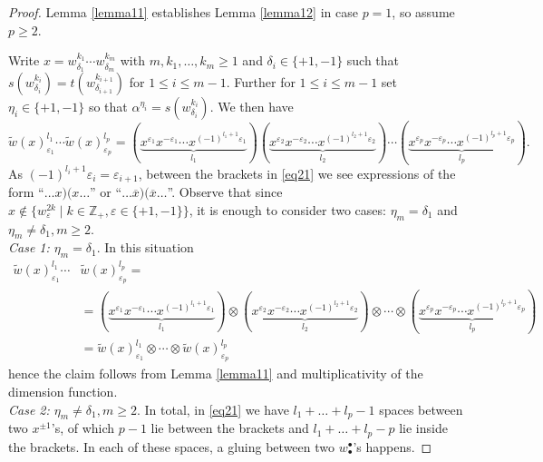 \documentclass[10pt,a4paper]{amsart}
\newcommand{\ZZ}{\mathbb{Z}}
\newcommand{\eps}{\varepsilon}
\newcommand{\ov}{\overline}
\begin{document}
\begin{proof}
Lemma \ref{lemma11} establishes Lemma \ref{lemma12} in case $p=1$, so assume $p\ge 2$.

Write $x=w^{k_1}_{\delta_1}\cdots w^{k_m}_{\delta_m}$ with $m,k_1,\dotsc,k_m\ge 1$ and $\delta_i\in \{+1,-1\}$ such that $s(w^{k_i}_{\delta_i})=t(w^{k_{i+1}}_{\delta_{i+1}})$ for $1\le i \le m-1$. Further for $1\le i \le m-1$  set $\eta_i\in\{+1, -1\}$ so that  $\alpha^{\eta_i}=s(w^{k_i}_{\delta_{i}})$. We then have
\begin{equation}\label{eq21}
\widetilde{w}(x)^{l_1}_{\eps_1}\cdots
\widetilde{w}(x)^{l_p}_{\eps_p}=
( \underbrace{x^{\eps_1}x^{-\eps_1} \cdots 
x^{(-1)^{l_1+1} \eps_1}}_{l_1})
( \underbrace{x^{\eps_2}x^{-\eps_2} \cdots 
x^{(-1)^{l_2+1} \eps_2}}_{l_2})
\cdots 
( \underbrace{x^{\eps_p}x^{-\eps_p} \cdots 
x^{(-1)^{l_p+1} \eps_p}}_{l_p}).
\end{equation}
As $(-1)^{l_{i}+1}\eps_i = \eps_{i+1}$,  between the brackets in \eqref{eq21} we see expressions of the form  ``$\dotsc x ) ( x \dotsc$'' or ``$\dotsc \ov{x} ) (\ov{x}\dotsc$''. Observe that since $x\notin\{ w^{2k}_\eps\mid k\in\ZZ_+,\eps\in\{+1,-1\}\}$, it is enough to consider two cases: $\eta_m=\delta_1$ and $\eta_m\neq \delta_1,m\ge 2$.\\

\emph{Case 1: $\eta_m=\delta_1$}. In this situation 
\begin{align*}
\widetilde{w}(x)^{l_1}_{\eps_1}\cdots&
\widetilde{w}(x)^{l_p}_{\eps_p} =\\
&=
( \underbrace{x^{\eps_1}x^{-\eps_1} \cdots 
x^{(-1)^{l_1+1} \eps_1}}_{l_1})\otimes
( \underbrace{x^{\eps_2}x^{-\eps_2} \cdots 
x^{(-1)^{l_2+1} \eps_2}}_{l_2})\otimes
\cdots \otimes
( \underbrace{x^{\eps_p}x^{-\eps_p} \cdots 
x^{(-1)^{l_p+1} \eps_p}}_{l_p})\\
&=
\widetilde{w}(x)^{l_1}_{\eps_1}\otimes\cdots\otimes
\widetilde{w}(x)^{l_p}_{\eps_p}
\end{align*}
hence the claim follows from Lemma \ref{lemma11} and multiplicativity of the dimension function.\\

\emph{Case 2: $\eta_m\neq \delta_1, m\ge 2$}.
In total, in \eqref{eq21} we have
$l_1+\dotsc+l_p -1$ spaces between two $x^{\pm 1}$'s, of which  $p-1$ lie between the brackets and $l_1+\dotsc+l_p-p$ lie inside the brackets. In each of these spaces, a gluing between two $w^\bullet_\bullet$'s happens.


\end{proof}
\end{document}
